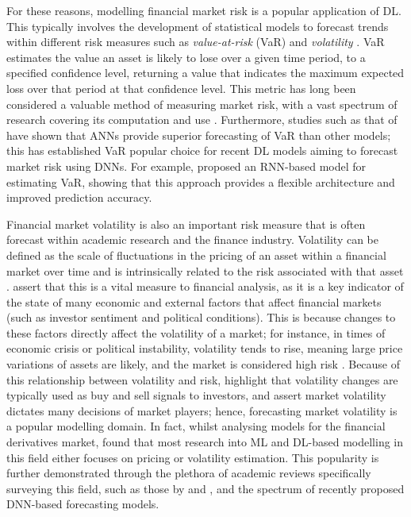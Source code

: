 \documentclass[a4paper, 11pt]{report}
\begin{document}
    For these reasons, modelling financial market risk is a popular application of DL. This typically involves the development of statistical models to forecast trends within different risk measures such as \emph{value-at-risk} (VaR) and \emph{volatility} \citep{peng-2021}. VaR estimates the value an asset is likely to lose over a given time period, to a specified confidence level, returning a value that indicates the maximum expected loss over that period at that confidence level. This metric has long been considered a valuable method of measuring market risk, with a vast spectrum of research covering its computation and use \citep{khindanova-2000}. Furthermore, studies such as that of \citet{sun-2009} have shown that ANNs provide superior forecasting of VaR than other models; this has established VaR popular choice for recent DL models aiming to forecast market risk using DNNs. For example, \citet{du-2019} proposed an RNN-based model for estimating VaR, showing that this approach provides a flexible architecture and improved prediction accuracy.

    Financial market volatility is also an important risk measure that is often forecast within academic research and the finance industry. Volatility can be defined as the scale of fluctuations in the pricing of an asset within a financial market over time and is intrinsically related to the risk associated with that asset \citep{cavalcante-2016}. \citet{cavalcante-2016} assert that this is a vital measure to financial analysis, as it is a key indicator of the state of many economic and external factors that affect financial markets (such as investor sentiment and political conditions). This is because changes to these factors directly affect the volatility of a market; for instance, in times of economic crisis or political instability, volatility tends to rise, meaning large price variations of assets are likely, and the market is considered high risk \citep{sezer-2019}. Because of this relationship between volatility and risk, \citet{tino-2001} highlight that volatility changes are typically used as buy and sell signals to investors, and \citet{ge-2022} assert market volatility dictates many decisions of market players; hence, forecasting market volatility is a popular modelling domain. In fact, whilst analysing models for the financial derivatives market, \citet{ozbayoglu-2020} found that most research into ML and DL-based modelling in this field either focuses on pricing or volatility estimation. This popularity is further demonstrated through the plethora of academic reviews specifically surveying this field, such as those by \citet{poon-2003} and \citet{ge-2022}, and the spectrum of recently proposed DNN-based forecasting models.
\end{document}
